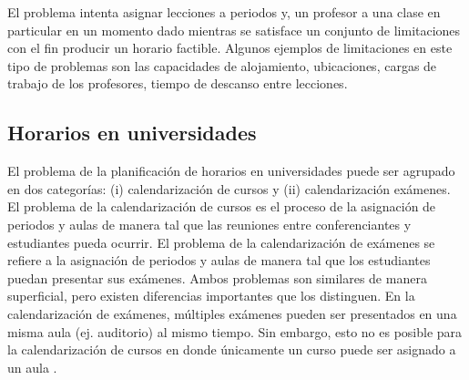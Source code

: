\documentclass[draft,12pt,headsepline,footsepline,paper=letter]{scrreprt}
\begin{document}
El problema intenta asignar lecciones a periodos y, un profesor a una clase en particular en un momento dado mientras se satisface un conjunto de limitaciones con el fin producir un horario factible. Algunos ejemplos de limitaciones en este tipo de problemas son las capacidades de alojamiento, ubicaciones, cargas de trabajo de los profesores, tiempo de descanso entre lecciones.

\subsection{Horarios en universidades}

El problema de la planificación de horarios en universidades puede ser agrupado en dos categorías: (i) calendarización de cursos y (ii) calendarización exámenes.
El problema de la calendarización de cursos es el proceso de la asignación de periodos y aulas de manera tal que las reuniones entre conferenciantes y estudiantes pueda ocurrir.
El problema de la calendarización de exámenes se refiere a la asignación de periodos y aulas de manera tal que los estudiantes puedan presentar sus exámenes.
Ambos problemas son similares de manera superficial, pero existen diferencias importantes que los distinguen.
En la calendarización de exámenes, múltiples exámenes pueden ser presentados en una misma aula (ej. auditorio) al mismo tiempo.
Sin embargo, esto no es posible para la calendarización de cursos en donde únicamente un curso puede ser asignado a un aula \citep[p.~11]{abdullah06heuristic-approaches}.
\end{document}
